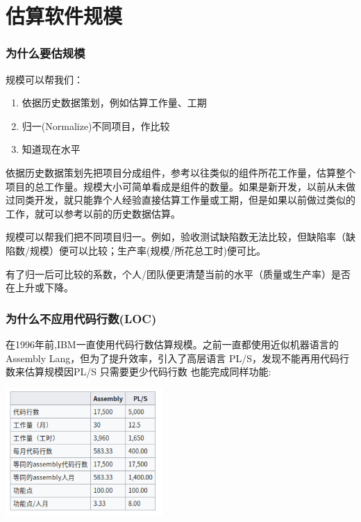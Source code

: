 \chapter{估算软件规模} %

\hypertarget{ux4e3aux4ec0ux4e48ux8981ux4f30ux89c4ux6a21}{%
\subsection{为什么要估规模}\label{ux4e3aux4ec0ux4e48ux8981ux4f30ux89c4ux6a21}}

规模可以帮我们：

\begin{enumerate}
\tightlist
\item
  依据历史数据策划，例如估算工作量、工期
\item
  归一(Normalize)不同项目，作比较
\item
  知道现在水平
\end{enumerate}

依据历史数据策划先把项目分成组件，参考以往类似的组件所花工作量，估算整个项目的总工作量。规模大小可简单看成是组件的数量。如果是新开发，以前从未做过同类开发，就只能靠个人经验直接估算工作量或工期，但是如果以前做过类似的工作，就可以参考以前的历史数据估算。

规模可以帮我们把不同项目归一。例如，验收测试缺陷数无法比较，但缺陷率（缺陷数/规模）便可以比较；生产率(规模/所花总工时)便可比。

有了归一后可比较的系数，个人/团队便更清楚当前的水平（质量或生产率）是否在上升或下降。

\hypertarget{ux4e3aux4ec0ux4e48ux4e0dux5e94ux7528ux4ee3ux7801ux884cux6570loc}{%
\subsection{为什么不应用代码行数(LOC)}\label{ux4e3aux4ec0ux4e48ux4e0dux5e94ux7528ux4ee3ux7801ux884cux6570loc}}

在1996年前,IBM一直使用代码行数估算规模。之前一直都使用近似机器语言的Assembly
Lang，但为了提升效率，引入了高层语言
PL/S，发现不能再用代码行数来估算规模因PL/S 只需要更少代码行数
也能完成同样功能:


\includegraphics[width=6cm]{Screenshotfrom2023-11-1301-59-06.png}

